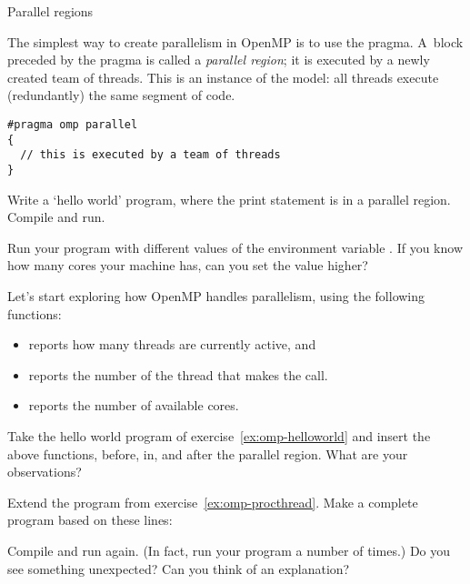 
 {Parallel regions}

The simplest way to create parallelism in OpenMP is to use
the  pragma.
A~block preceded by the  pragma
is called a \emph{parallel region}; it
is executed by a newly created team of threads. 
This is an instance of the  model:
all threads execute (redundantly) the same segment of code.
\begin{lstlisting}
#pragma omp parallel
{
  // this is executed by a team of threads
}
\end{lstlisting}

\begin{exercise}
  \label{ex:omp-helloworld}
  Write a `hello world' program, where the
  print statement is in a parallel region.
  Compile and run.

  Run your program with different values of the environment variable
  .
  If you know how many cores your machine has,
  can you set the value higher?
\end{exercise}

Let's start exploring how OpenMP handles parallelism,
using the following functions:
\begin{itemize}
\item {} reports how many threads are
  currently active, and
\item {} reports the number of the
  thread that makes the call.
\item {} reports the number of available
  cores.
\end{itemize}

\begin{exercise}
  \label{ex:omp-procthread}
  Take the hello world program of exercise~\ref{ex:omp-helloworld}
  and insert the above functions, before, in, and after the parallel region.
  What are your observations?
\end{exercise}

\begin{exercise}
  \label{ex:omp-procthreadn}
  Extend the program from exercise~\ref{ex:omp-procthread}. Make a
  complete program based on these lines:


  Compile and run again. (In fact, run your program a number of times.)
  Do you see something unexpected? Can you think
  of an explanation?
\end{exercise}

